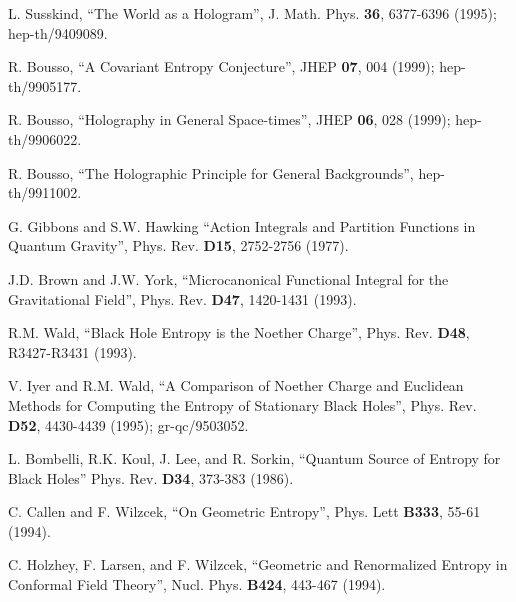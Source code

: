 \begin{thebibliography}{999}
 L. Susskind, ``The World as a
Hologram'', J. Math. Phys. {\bf 36}, 6377-6396
(1995); hep-th/9409089. 

 R. Bousso, ``A Covariant Entropy
Conjecture'', JHEP {\bf 07}, 004 (1999);
hep-th/9905177. 

 R. Bousso, ``Holography in General
Space-times'', JHEP {\bf 06}, 028 (1999);
hep-th/9906022. 

 R. Bousso, ``The Holographic Principle
for General Backgrounds'', hep-th/9911002. 

 G. Gibbons and S.W. Hawking ``Action
Integrals and Partition Functions in Quantum Gravity'',
Phys. Rev. {\bf D15}, 2752-2756 (1977).  

 J.D. Brown and J.W. York,
``Microcanonical Functional Integral for the Gravitational Field'',
Phys. Rev. {\bf D47}, 1420-1431 (1993).  

 R.M. Wald, ``Black Hole Entropy is the
Noether Charge'', Phys. Rev. {\bf D48}, R3427-R3431 (1993).

 V. Iyer and R.M. Wald, ``A Comparison
of Noether Charge and Euclidean Methods for Computing the Entropy of
Stationary Black Holes'', Phys. Rev. {\bf D52}, 4430-4439 (1995);
gr-qc/9503052.  

 L. Bombelli, R.K. Koul, J. Lee, and
R. Sorkin, ``Quantum Source of Entropy for Black Holes''
Phys. Rev. {\bf D34}, 373-383 (1986).  

 C. Callen and F. Wilzcek, ``On Geometric
Entropy'', Phys. Lett {\bf B333}, 55-61 (1994).  

 C. Holzhey, F. Larsen, and F. Wilzcek,
``Geometric and Renormalized Entropy in Conformal Field Theory'',
Nucl. Phys. {\bf B424}, 443-467 (1994).  


\end{thebibliography}
